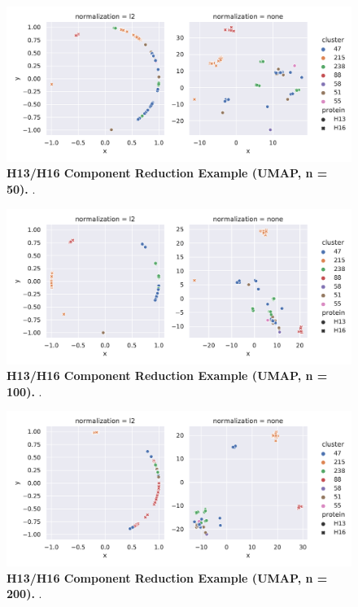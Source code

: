 \begin{figure}[!hbt]
    \centering
    \includegraphics[width=\dimexpr\textwidth-2\fboxsep-2\fboxrule,fbox]{UMAP/Difference_Segment_4_H_UMAP_Neighbors_50.pdf}
    \caption[H13/H16 Component Reduction Example (\Acrshort{UMAP}, n = 50)]{\textbf{H13/H16 Component Reduction Example (\Acrshort{UMAP}, n = 50).} .}
    \label{fig:Reduction_Example_UMAP_50}
\end{figure}

\begin{figure}[!hbt]
    \centering
    \includegraphics[width=\dimexpr\textwidth-2\fboxsep-2\fboxrule,fbox]{UMAP/Difference_Segment_4_H_UMAP_Neighbors_100.pdf}
    \caption[H13/H16 Component Reduction Example (\Acrshort{UMAP}, n = 100)]{\textbf{H13/H16 Component Reduction Example (\Acrshort{UMAP}, n = 100).} .}
    \label{fig:Reduction_Example_UMAP_100}
\end{figure}

\begin{figure}[!hbt]
    \centering
    \includegraphics[width=\dimexpr\textwidth-2\fboxsep-2\fboxrule,fbox]{UMAP/Difference_Segment_4_H_UMAP_Neighbors_200.pdf}
    \caption[H13/H16 Component Reduction Example (\Acrshort{UMAP}, n = 200)]{\textbf{H13/H16 Component Reduction Example (\Acrshort{UMAP}, n = 200).} .}   \label{fig:Reduction_Example_UMAP_200}
\end{figure}